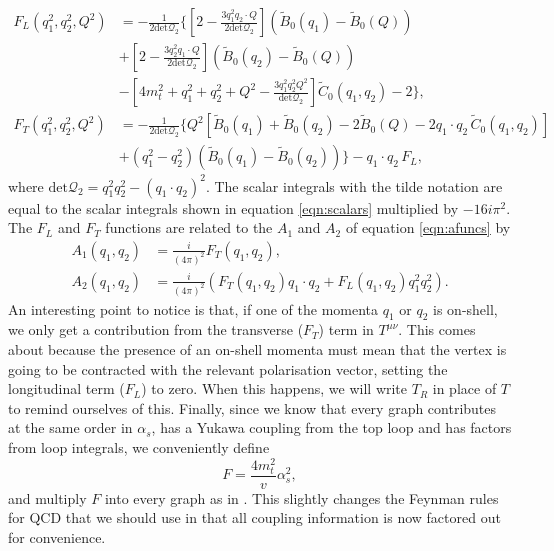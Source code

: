 \begin{equation}
\begin{split}
F_L(q_1^2,q_2^2,Q^2) &= -\frac{1}{2 \text{det} \mathcal{Q}_2} \bigg \{ \left[2-\frac{3 q_1^2 q_2 \cdot Q}{2 \text{det}\mathcal{Q}_2} \right] \left(\tilde{B}_0(q_1)-\tilde{B}_0(Q) \right)\\
&+ \left[2-\frac{3 q_2^2 q_1 \cdot Q}{2 \text{det}\mathcal{Q}_2} \right] \left(\tilde{B}_0(q_2)-\tilde{B}_0(Q) \right) \\
&- \left[4m_t^2 + q_1^2 + q_2^2 + Q^2 - \frac{3 q_1^2 q_2^2 Q^2}{\text{det}\mathcal{Q}_2} \right] \tilde{C}_0(q_1,q_2) - 2 \bigg \}, \\
F_T(q_1^2, q_2^2, Q^2) &= -\frac{1}{2 \text{det} \mathcal{Q}_2} \bigg \{ Q^2 \left[\tilde{B}_0(q_1) + \tilde{B}_0(q_2) - 2\tilde{B}_0(Q) - 2 q_1 \cdot q_2 \hspace{2pt} \tilde{C}_0(q_1,q_2) \right] \\
&+ \left(q_1^2-q_2^2 \right) \left(\tilde{B}_0(q_1) - \tilde{B}_0(q_2)\right) \bigg \} - q_1 \cdot q_2 \hspace{2pt} F_L,
\end{split}
\end{equation}
where $\text{det} \mathcal{Q}_2 =q_1^2q_2^2 - (q_1 \cdot q_2)^2$. The scalar integrals with the tilde notation are equal to the scalar integrals shown in equation \ref{eqn:scalars} multiplied by $-16i\pi^2$. The $F_L$ and $F_T$ functions are related to the $A_1$ and $A_2$ of equation \ref{eqn:afuncs} by
\begin{equation}
\begin{split}
A_1(q_1,q_2) &= \frac{i}{(4 \pi)^2}F_T(q_1,q_2), \\
A_2(q_1,q_2) &= \frac{i}{(4 \pi)^2}\left(F_T(q_1,q_2) q_1 \cdot q_2 + F_L(q_1,q_2)q_1^2q_2^2 \right).
\end{split}
\end{equation}
An interesting point to notice is that, if one of the momenta $q_1$ or $q_2$ is on-shell, we only get a contribution from the transverse ($F_T$) term in $T^{\mu \nu}$. This comes about because the presence of an on-shell momenta must mean that the vertex is going to be contracted with the relevant polarisation vector, setting the longitudinal term ($F_L$) to zero. When this happens, we will write $T_R$ in place of $T$ to remind ourselves of this. Finally, since we know that every graph contributes at the same order in $\alpha_s$, has a Yukawa coupling from the top loop and has factors from loop integrals, we conveniently define
\begin{equation}
 F = \frac{4 m_t^2}{v} \alpha_s^2, 
\end{equation}
and multiply $F$ into every graph as in \cite{DelDuca2001}. This slightly changes the Feynman rules for QCD that we should use in that all coupling information is now factored out for convenience.

